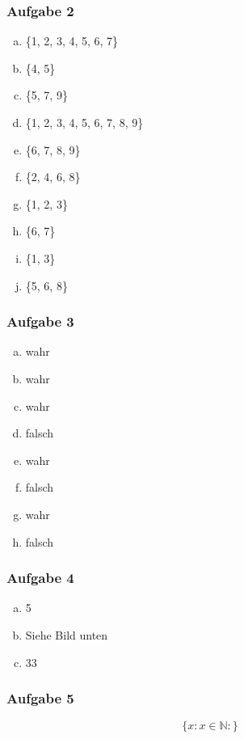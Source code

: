 \documentclass[12pt, a4paper, oneside]{article}
\begin{document}
\subsubsection{Aufgabe 2}
\begin{enumerate}[(a)]
  \item \{1, 2, 3, 4, 5, 6, 7\}
  \item \{4, 5\}
  \item \{5, 7, 9\}
  \item \{1, 2, 3, 4, 5, 6, 7, 8, 9\}
  \item \{6, 7, 8, 9\}
  \item \{2, 4, 6, 8\}
  \item \{1, 2, 3\}
  \item \{6, 7\}
  \item \{1, 3\}
  \item \{5, 6, 8\}
\end{enumerate}

\subsubsection{Aufgabe 3}
\begin{enumerate}[(a)]
  \item wahr
  \item wahr
  \item wahr
  \item falsch
  \item wahr
  \item falsch
  \item wahr
  \item falsch
\end{enumerate}

\subsubsection{Aufgabe 4} 
\begin{enumerate}[(a)]
  \item 5
  \item Siehe Bild unten
  \item 33
\end{enumerate}

\subsubsection{Aufgabe 5}
\begin{equation}
  \{x : x \in \mathbb{N} : \}
\end{equation}
\end{document}
